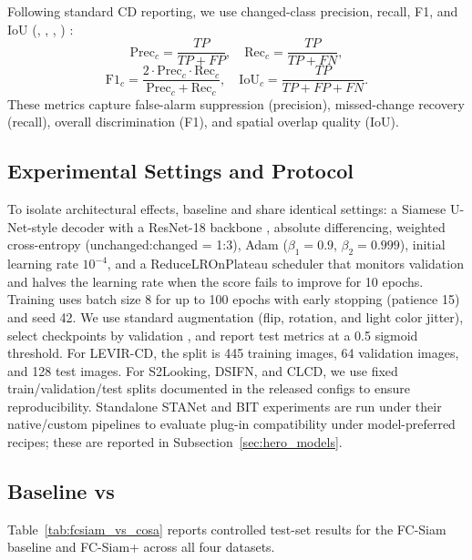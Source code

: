 Following standard CD reporting, we use changed-class precision, recall, F1, and IoU (\PrecC{}, \RecC{}, \Fonec{}, \Iouc{}) \cite{devansh2025,kamalakar2025}:
\begin{equation}
\mathrm{Prec}_c=\frac{TP}{TP+FP}, \quad \mathrm{Rec}_c=\frac{TP}{TP+FN},
\end{equation}
\begin{equation}
\mathrm{F1}_c=\frac{2\cdot \mathrm{Prec}_c\cdot \mathrm{Rec}_c}{\mathrm{Prec}_c+\mathrm{Rec}_c}, \quad \mathrm{IoU}_c=\frac{TP}{TP+FP+FN}.
\end{equation}
These metrics capture false-alarm suppression (precision), missed-change recovery (recall), overall discrimination (F1), and spatial overlap quality (IoU).

\subsection{Experimental Settings and Protocol}
To isolate architectural effects, baseline and \cosa{} share identical settings: a Siamese U-Net-style decoder \cite{ronneberger2015unet} with a ResNet-18 backbone \cite{he2016resnet}, absolute differencing, weighted cross-entropy (unchanged:changed = 1:3), Adam ($\beta_1=0.9$, $\beta_2=0.999$), initial learning rate $10^{-4}$, and a ReduceLROnPlateau scheduler that monitors validation \Fonec{} and halves the learning rate when the score fails to improve for 10 epochs. Training uses batch size 8 for up to 100 epochs with early stopping (patience 15) and seed 42. We use standard augmentation (flip, rotation, and light color jitter), select checkpoints by validation \Fonec{}, and report test metrics at a 0.5 sigmoid threshold. For LEVIR-CD, the split is 445 training images, 64 validation images, and 128 test images. For S2Looking, DSIFN, and CLCD, we use fixed train/validation/test splits documented in the released configs to ensure reproducibility. Standalone STANet and BIT experiments are run under their native/custom pipelines to evaluate plug-in compatibility under model-preferred recipes; these are reported in Subsection~\ref{sec:hero_models}.

\subsection{Baseline vs \cosa{}}
Table~\ref{tab:fcsiam_vs_cosa} reports controlled test-set results for the FC-Siam baseline and FC-Siam+\cosa{} across all four datasets.



